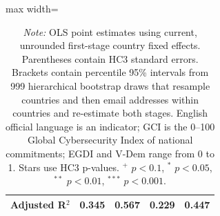 \begin{table}[!htbp]
\begin{adjustbox}{max width=\linewidth}
\begin{tabular}{lrrrr}
Adjusted R$^2$ & 0.345 & 0.567 & 0.229 & 0.447 \\
\bottomrule
\end{tabular}
\end{adjustbox}
\caption*{\scriptsize \emph{Note:} OLS point estimates using current, unrounded first-stage country fixed effects. Parentheses contain HC3 standard errors. Brackets contain percentile 95\% intervals from 999 hierarchical bootstrap draws that resample countries and then email addresses within countries and re-estimate both stages. English official language is an indicator; GCI is the 0--100 Global Cybersecurity Index of national commitments; EGDI and V-Dem range from 0 to 1. Stars use HC3 p-values. $^{{+}}$ $p<0.1$, $^{{*}}$ $p<0.05$, $^{{**}}$ $p<0.01$, $^{{***}}$ $p<0.001$.}
\end{table}
